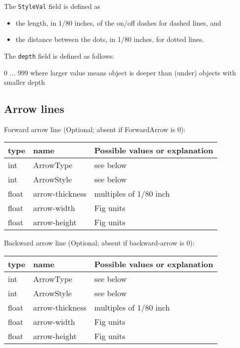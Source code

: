 \documentclass[10pt, a4paper]{article}
\begin{document}
\noindent
The {\tt StyleVal} field is defined as 
%
\begin{itemize}
\item
the length, in 1/80 inches, of the on/off dashes for dashed lines, and 
\item
the distance between the dots, in 1/80 inches, for dotted lines.
\end{itemize}

\noindent
The {\tt depth} field is defined as follows:

         0 ... 999 where larger value means object is deeper than (under)
                   objects with smaller depth

\subsection{Arrow lines}\label{subsec:paramArrowLines}

Forward arrow line (Optional; absent if ForwardArrow is 0):

\begin{tabular}{|lll|}
\hline
type & name & Possible values or explanation \\
\hline
\hline
int    & ArrowType              & see below \\
int    & ArrowStyle             & see below \\
float  & arrow-thickness         & multiples of 1/80 inch \\
float  & arrow-width             & Fig units \\
float  & arrow-height            & Fig units \\
\hline
\end{tabular}

Backward arrow line (Optional; absent if backward-arrow is 0):

\begin{tabular}{|lll|}
\hline
type & name & Possible values or explanation \\
\hline
\hline
int    & ArrowType              & see below \\
int    & ArrowStyle             & see below \\
float  & arrow-thickness         & multiples of 1/80 inch \\
float  & arrow-width             & Fig units \\
float  & arrow-height            & Fig units \\
\hline
\end{tabular}
\end{document}
